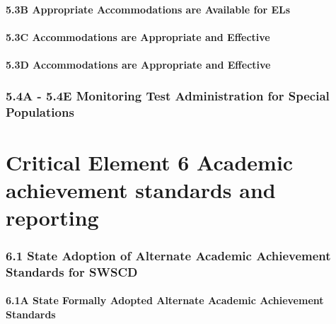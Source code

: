 \documentclass[]{book}
\begin{document}
\hypertarget{b-appropriate-accommodations-are-available-for-els}{%
\subsubsection{5.3B Appropriate Accommodations are Available for ELs}\label{b-appropriate-accommodations-are-available-for-els}}

\hypertarget{c-accommodations-are-appropriate-and-effective}{%
\subsubsection{5.3C Accommodations are Appropriate and Effective}\label{c-accommodations-are-appropriate-and-effective}}

\hypertarget{d-accommodations-are-appropriate-and-effective}{%
\subsubsection{5.3D Accommodations are Appropriate and Effective}\label{d-accommodations-are-appropriate-and-effective}}

\hypertarget{a---5.4e-monitoring-test-administration-for-special-populations}{%
\subsection{5.4A - 5.4E Monitoring Test Administration for Special Populations}\label{a---5.4e-monitoring-test-administration-for-special-populations}}

\hypertarget{critical-element-6-academic-achievement-standards-and-reporting}{%
\chapter{Critical Element 6 Academic achievement standards and reporting}\label{critical-element-6-academic-achievement-standards-and-reporting}}

\hypertarget{state-adoption-of-alternate-academic-achievement-standards-for-swscd}{%
\subsection{6.1 State Adoption of Alternate Academic Achievement Standards for SWSCD}\label{state-adoption-of-alternate-academic-achievement-standards-for-swscd}}

\hypertarget{a-state-formally-adopted-alternate-academic-achievement-standards}{%
\subsubsection{6.1A State Formally Adopted Alternate Academic Achievement Standards}\label{a-state-formally-adopted-alternate-academic-achievement-standards}}
\end{document}
